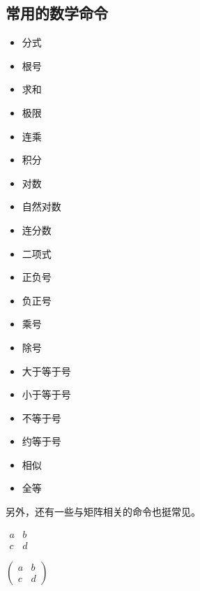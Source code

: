 {\subsection{常用的数学命令}
\begin{itemize}[nosep]
	\item 分式 
	\item 根号 
	\item 求和 
	\item 极限 
	\item 连乘 
	\item 积分 
	\item 对数 
	\item 自然对数 
	\item 连分数 
	\item 二项式 
	\item 正负号 \inlinedemo{\pm}
	\item 负正号 \inlinedemo{\mp}
	\item 乘号 \inlinedemo{\times}
	\item 除号 \inlinedemo{\div}
	\item 大于等于号 \inlinedemo{\ge}
	\item 小于等于号 \inlinedemo{\le}
	\item 不等于号 \inlinedemo{\ne}
	\item 约等于号 \inlinedemo{\approx}
	\item 相似 \inlinedemo{\sim}
	\item 全等 \inlinedemo{\cong}
\end{itemize}
\vspace{1cm}
另外，还有一些与矩阵相关的命令也挺常见。
\begin{texlst}
\begin{math}
\begin{matrix}
	a & b \\
	c & d
\end{matrix}
\end{math}
\end{texlst}
\vfill
\pagebreak

\begin{texlst}
\begin{math}
\begin{pmatrix}
	a & b \\
	c & d
\end{pmatrix}
\end{math}
\end{texlst}

}

